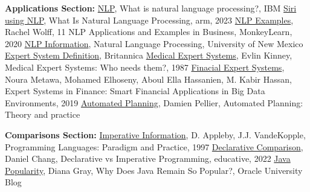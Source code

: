 \documentclass{article}
\theoremstyle{theorem}
\theoremstyle{definition}
\theoremstyle{remark}
\begin{document}
\begin{thebibliography}{99}
\noindent\textbf{Applications Section:}\newline
{} \href{https://www.ibm.com/topics/natural-language-processing}{NLP}, What is natural language processing?, IBM
 \href{https://www.arm.com/glossary/natural-language-processing}{Siri using NLP}, What Is Natural Language Processing, arm, 2023
 \href{https://monkeylearn.com/blog/natural-language-processing-applications/}{NLP Examples}, Rachel Wolff, 11 NLP Applications and Examples in Business, MonkeyLearn, 2020
 \href{https://www.cs.unm.edu/~luger/ai-final2/CH8_Natural%20Language%20Processing%20in%20Prolog.pdf}{NLP Information}, Natural Language Processing, University of New Mexico
 \href{https://www.britannica.com/technology/expert-system}{Expert System Definition}, Britannica
 \href{https://journal.chestnet.org/action/showPdf?pii=S0012-3692%2815%2942851-X}{Medical Expert Systems}, Evlin Kinney, Medical Expert Systems: Who needs them?, 1987
 \href{https://www.routledge.com/Expert-Systems-in-Finance-Smart-Financial-Applications-in-Big-Data-Environments/Metawa-Elhoseny-Hassanien-Hassan/p/book/9780367729011}{Finacial Expert Systems}, Noura Metawa, Mohamed Elhoseny, Aboul Ella Hassanien, M. Kabir Hassan, Expert Systems in Finance: Smart Financial Applications in Big Data Environments, 2019
 \href{https://cw.fel.cvut.cz/old/_media/courses/a4m33pah/planning-course.pdf}{Automated Planning}, Damien Pellier, Automated Planning: Theory and practice \newline

\noindent\textbf{Comparisons Section:}\newline
{} \href{https://icarus.cs.weber.edu/~dab/cs1410/textbook/1.Basics/programs.html}{Imperative Information}, D. Appleby, J.J. VandeKopple, Programming Languages: Paradigm and Practice, 1997
 \href{https://www.educative.io/blog/declarative-vs-imperative-programming}{Declarative Comparison}, Daniel Chang, Declarative vs Imperative Programming, educative, 2022
 \href{https://blogs.oracle.com/oracleuniversity/post/why-does-java-remain-so-popular}{Java Popularity}, Diana Gray, Why Does Java Remain So Popular?, Oracle University Blog\newline


\end{thebibliography}
\end{document}
